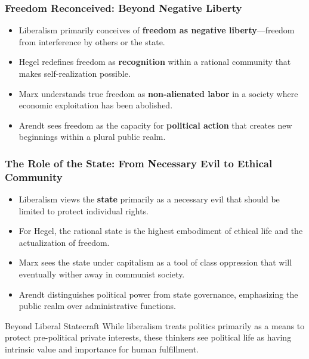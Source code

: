 \documentclass{beamer}
\begin{document}
\begin{frame}
\frametitle{Freedom Reconceived: Beyond Negative Liberty}
\begin{itemize}
    \item Liberalism primarily conceives of \textbf{freedom as negative liberty}—freedom from interference by others or the state.
    \item Hegel redefines freedom as \textbf{recognition} within a rational community that makes self-realization possible.
    \item Marx understands true freedom as \textbf{non-alienated labor} in a society where economic exploitation has been abolished.
    \item Arendt sees freedom as the capacity for \textbf{political action} that creates new beginnings within a plural public realm.
\end{itemize}

\end{frame}

\begin{frame}
\frametitle{The Role of the State: From Necessary Evil to Ethical Community}
\begin{itemize}
    \item Liberalism views the \textbf{state} primarily as a necessary evil that should be limited to protect individual rights.
    \item For Hegel, the rational state is the highest embodiment of ethical life and the actualization of freedom.
    \item Marx sees the state under capitalism as a tool of class oppression that will eventually wither away in communist society.
    \item Arendt distinguishes political power from state governance, emphasizing the public realm over administrative functions.
\end{itemize}

\begin{block}{Beyond Liberal Statecraft}
While liberalism treats politics primarily as a means to protect pre-political private interests, these thinkers see political life as having intrinsic value and importance for human fulfillment.
\end{block}
\end{frame}
\end{document}
